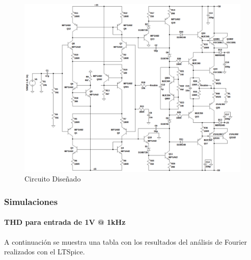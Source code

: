 \documentclass[a4paper,12pt,twoside]{article}
\begin{document}
\begin{figure}[H]
\centering
\includegraphics[scale=0.3]{img/circuito.pdf}
\caption{Circuito Diseñado}
\label{circuito} 
\end{figure}


\subsubsection{Simulaciones}

\paragraph{THD para entrada de 1V @ 1kHz} A continuación se muestra una tabla con los resultados del análisis de Fourier realizados con el LTSpice. 
\end{document}

